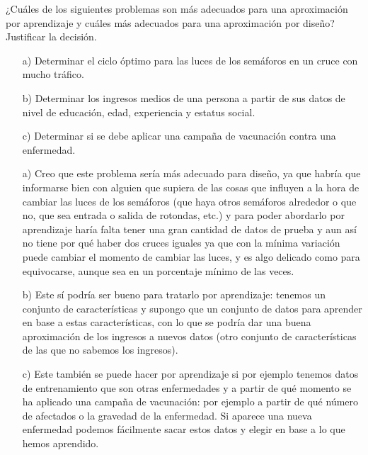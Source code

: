 \documentclass[12pt]{article}
\theoremstyle{definition}
\begin{document}
\begin{pregunta}
¿Cuáles de los siguientes problemas son más adecuados para una aproximación por aprendizaje y cuáles más adecuados para una aproximación por diseño? Justificar la decisión.
\begin{enumerate}
\item[a)] Determinar el ciclo óptimo para las luces de los semáforos en un cruce con mucho tráfico.
\item[b)] Determinar los ingresos medios de una persona a partir de sus datos de nivel de educación, edad, experiencia y estatus social.
\item[c)] Determinar si se debe aplicar una campaña de vacunación contra una enfermedad.
\end{enumerate}

\begin{enumerate}
\item[a)] Creo que este problema sería más adecuado para diseño, ya que habría que informarse bien con alguien que supiera de las cosas que influyen a la hora de cambiar las luces de los semáforos (que haya otros semáforos alrededor o que no, que sea entrada o salida de rotondas, etc.) y para poder abordarlo por aprendizaje haría falta tener una gran cantidad de datos de prueba y aun así no tiene por qué haber dos cruces iguales ya que con la mínima variación puede cambiar el momento de cambiar las luces, y es algo delicado como para equivocarse, aunque sea en un porcentaje mínimo de las veces.
\item[b)] Este sí podría ser bueno para tratarlo por aprendizaje: tenemos un conjunto de características y supongo que un conjunto de datos para aprender en base a estas características, con lo que se podría dar una buena aproximación de los ingresos a nuevos datos (otro conjunto de características de las que no sabemos los ingresos).
\item[c)] Este también se puede hacer por aprendizaje si por ejemplo tenemos datos de entrenamiento que son otras enfermedades y a partir de qué momento se ha aplicado una campaña de vacunación: por ejemplo a partir de qué número de afectados o la gravedad de la enfermedad. Si aparece una nueva enfermedad podemos fácilmente sacar estos datos y elegir en base a lo que hemos aprendido.
\end{enumerate}

\end{pregunta}
\end{document}
